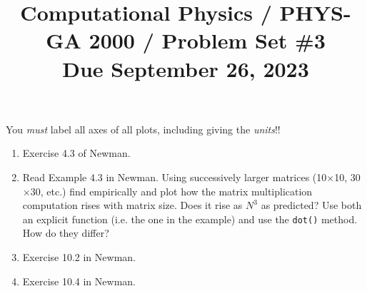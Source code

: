 \documentclass[11pt, preprint]{aastex}
\begin{document}
\title{\bf Computational Physics / PHYS-GA 2000 / Problem Set \#3
\\ Due September 26, 2023}

You {\it must} label all axes of all plots, including giving the {\it
  units}!!

\begin{enumerate}
  \item Exercise 4.3 of Newman.

  \item Read Example 4.3 in Newman. Using successively larger matrices
    (10$\times$10, 30$\times$30, etc.) find empirically and plot how
    the matrix multiplication computation rises with matrix size. Does
    it rise as $N^3$ as predicted? Use both an explicit function
    (i.e. the one in the example) and use the {\tt dot()} method. How
    do they differ?

  \item Exercise 10.2 in Newman.
  \item Exercise 10.4 in Newman.

\end{enumerate}
\end{document}
